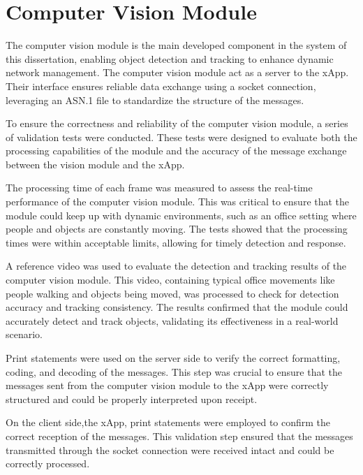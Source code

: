 \section{Computer Vision Module}\label{sec:cv_module}
The computer vision module is the main developed component in the system of this dissertation, enabling object detection and tracking to enhance dynamic network management.
The computer vision module act as a server to the xApp.
Their interface ensures reliable data exchange using a socket connection, leveraging an ASN.1 file to standardize the structure of the messages.

To ensure the correctness and reliability of the computer vision module, a series of validation tests were conducted. These tests were designed to evaluate both the processing capabilities of the module and the accuracy of the message exchange between the vision module and the xApp.

The processing time of each frame was measured to assess the real-time performance of the computer vision module. This was critical to ensure that the module could keep up with dynamic environments, such as an office setting where people and objects are constantly moving. The tests showed that the processing times were within acceptable limits, allowing for timely detection and response.

A reference video was used to evaluate the detection and tracking results of the computer vision module. This video, containing typical office movements like people walking and objects being moved, was processed to check for detection accuracy and tracking consistency. The results confirmed that the module could accurately detect and track objects, validating its effectiveness in a real-world scenario.


Print statements were used on the server side to verify the correct formatting, coding, and decoding of the messages.
This step was crucial to ensure that the messages sent from the computer vision module to the xApp were correctly structured and could be properly interpreted upon receipt.

On the client side,the xApp, print statements were employed to confirm the correct reception of the messages. This validation step ensured that the messages transmitted through the socket connection were received intact and could be  correctly processed.

